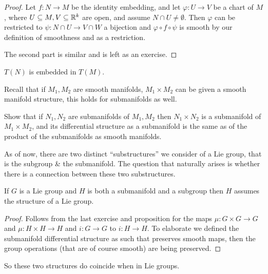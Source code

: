 \begin{proof}
	Let $f : N \to M$ be the identity embedding, and let $\varphi : U \to V$ be a chart of $M$, where $U \subseteq M, V \subseteq \mathbb{R}^k$ are open, and assume $N \cap U \ne \emptyset$.
	Then $\varphi$ can be restricted to $\psi : N \cap U \to V \cap W$ a bijection and $\varphi \circ f \circ \psi$ is smooth by our definition of smoothness and as a restriction.

	The second part is similar and is left as an exercise.
\end{proof}
\begin{corollary}
	$T(N)$ is embedded in $T(M)$.
\end{corollary}
Recall that if $M_1, M_2$ are smooth manifolds, $M_1 \times M_2$ can be given a smooth manifold structure, this holds for submanifolds as well.
\begin{exercise}
	Show that if $N_1, N_2$ are submanifolds of $M_1, M_2$ then $N_1 \times N_2$ is a submanifold of $M_1 \times M_2$,
	and its differential structure as a submanifold is the same as of the product of the submanifolds as smooth manifolds.
\end{exercise}
As of now, there are two distinct ``substructures'' we consider of a Lie group, that is the subgroup \& the submanifold.
The question that naturally arises is whether there is a connection between these two substructures.
\begin{proposition}
	If $G$ is a Lie group and $H$ is both a submanifold and a subgroup then $H$ assumes the structure of a Lie group.
\end{proposition}
\begin{proof}
	Follows from the last exercise and proposition for the maps $\mu : G \times G \to G$ and $\mu : H \times H \to H$ and $i : G \to G$ to $i : H \to H$.
	To elaborate we defined the submanifold differential structure as such that preserves smooth maps, then the group operations (that are of course smooth) are being preserved.
\end{proof}
So these two structures do coincide when in Lie groups.

